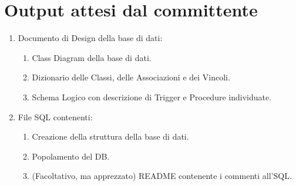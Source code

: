 \section{Output attesi dal committente}
\begin{enumerate}
\item Documento di Design della base di dati:
\begin{enumerate}
\item Class Diagram della base di dati.
\item Dizionario delle Classi, delle Associazioni e dei Vincoli.
\item Schema Logico con descrizione di Trigger e Procedure individuate.
\end{enumerate}
\item File SQL contenenti:
\begin{enumerate}
\item Creazione della struttura della base di dati.
\item Popolamento del DB.
\item (Facoltativo, ma apprezzato) README contenente i commenti all’SQL.
\end{enumerate}
\end{enumerate}